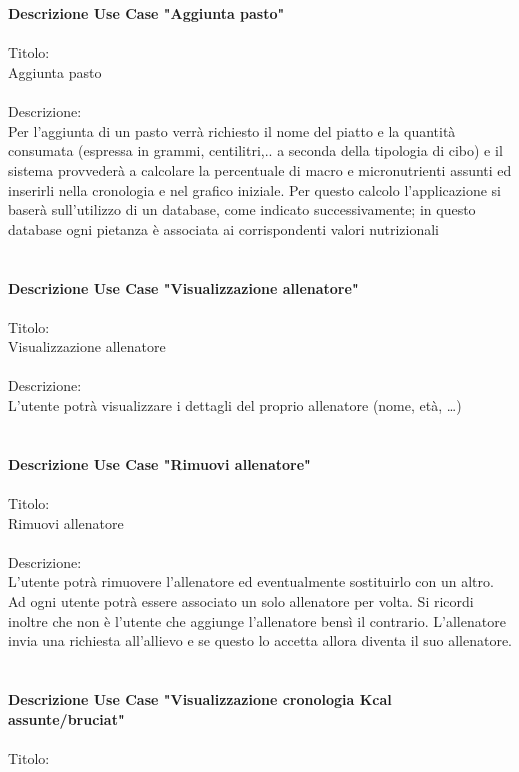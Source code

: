 \documentclass{article}
\begin{document}
\\
\\
\textbf{Descrizione Use Case "Aggiunta pasto"}\\
\\
Titolo:\\
Aggiunta pasto\\
\\
Descrizione: \\
Per l’aggiunta di un pasto verrà richiesto il nome del piatto e la quantità consumata (espressa in grammi, centilitri,.. a seconda della tipologia
di cibo) e il sistema provvederà a calcolare la percentuale di macro e micronutrienti assunti ed inserirli nella cronologia e nel grafico iniziale.
Per questo calcolo l’applicazione si baserà sull’utilizzo di un database, come indicato successivamente; in questo database ogni pietanza è
associata ai corrispondenti valori nutrizionali\\
\\
\\
\textbf{Descrizione Use Case "Visualizzazione allenatore"}\\
\\
Titolo:\\
Visualizzazione allenatore\\
\\
Descrizione:\\ 
L’utente potrà visualizzare i dettagli del proprio allenatore (nome, età, …)\\
\\
\\
\textbf{Descrizione Use Case "Rimuovi allenatore"}\\
\\
Titolo:\\
Rimuovi allenatore\\
\\
Descrizione:\\ 
L’utente potrà rimuovere l’allenatore ed eventualmente sostituirlo con un altro. Ad ogni utente potrà essere associato un solo allenatore per volta.
Si ricordi inoltre che non è l’utente che aggiunge l’allenatore bensì il contrario. L’allenatore invia una richiesta all’allievo e se questo lo
accetta allora diventa il suo allenatore.\\
\\
\\
\textbf{Descrizione Use Case "Visualizzazione cronologia Kcal assunte/bruciat"}\\
\\
Titolo:\\
\end{document}
